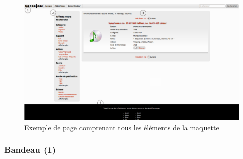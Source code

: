 \documentclass[letter, 11pt]{report}
\begin{document}
\begin{figure}[htbp]
	\begin{center}
		\includegraphics[scale=0.3]{pageType.png}
	\end{center}
	\caption{Exemple de page comprenant tous les éléments de la maquette}
\end{figure}

\subsubsection{Bandeau (1)}
\end{document}

